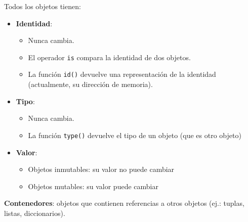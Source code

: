 \begin{frame}[fragile]



Todos los objetos tienen:
\begin{itemize}
\item {\bf Identidad}: 
  \begin{footnotesize}
    \begin{itemize}
    \item Nunca cambia. 
    \item El operador \verb|is| compara la identidad de dos objetos.
    \item La función \verb|id()| devuelve una representación de la
      identidad (actualmente, su dirección de memoria).
  \end{itemize}
\end{footnotesize}
\item {\bf Tipo}:
  \begin{footnotesize}
    \begin{itemize}
    \item Nunca cambia.
    \item La función \verb|type()| devuelve el tipo de un objeto (que
      es otro objeto) 
    \end{itemize}
  \end{footnotesize}
\item {\bf Valor}:
  \begin{footnotesize}
    \begin{itemize}
    \item Objetos inmutables: su valor no puede cambiar
    \item Objetos mutables: su valor puede cambiar
    \end{itemize}
  \end{footnotesize}
\end{itemize}
{\bf Contenedores}: objetos que contienen referencias a otros objetos
(ej.: tuplas, listas, diccionarios).

\end{frame}


